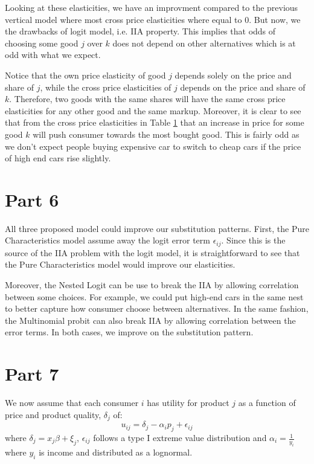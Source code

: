 \documentclass[12pt]{article}
\newcommand{\1}{{\bf 1}} %
\begin{document}
\begin{table}[H]
{\begin{tabular}{lllllllllll}
 \hline
\bottomrule
\end{tabular}%
}
 \label{tab:logit_elasticities}
\end{table}

Looking at these elasticities, we have an improvment compared to the previous vertical model where most cross price elasticities where equal to 0. But now, we the drawbacks of logit model, i.e. IIA property. This implies that odds of choosing some good $j$ over $k$ does not depend on other alternatives which is at odd with what we expect.

Notice that the own price elasticity of good $j$ depends solely on the price and share of $j$, while the cross price elasticities of $j$ depends on the price and share of $k$. Therefore, two goods with the same shares will have the same cross price elasticities for any other good and the same markup. Moreover, it is clear to see that from the cross price elasticities in Table \ref{tab:logit_elasticities} that an increase in price for some good $k$ will push consumer towards the most bought good. This is fairly odd as we don't expect people buying expensive car to switch to cheap cars if the price of high end cars rise slightly.



\section*{Part 6}

All three proposed model could improve our substitution patterns. First, the Pure Characteristics model assume away the logit error term $\epsilon_{ij}$. Since this is the source of the IIA problem with the logit model, it is straightforward to see that the Pure Characteristics model would improve our elasticities.

Moreover, the Nested Logit can be use to break the IIA by allowing correlation between some choices. For example, we could put high-end cars in the same nest to better capture how consumer choose between alternatives. In the same fashion, the Multinomial probit can also break IIA by allowing correlation between the error terms. In both cases, we improve on the substitution pattern.


\section*{Part 7}


We now assume that each consumer $i$ has utility for product $j$ as a function of price and product quality, $\delta_j$ of:
\[
u_{ij} =\delta_j-\alpha_i p_j+\epsilon_{ij}
\]
where $\delta_j = x_j\beta +\xi_j $, $\epsilon_{ij}$ follows a type I extreme value distribution and $\alpha_i = \frac{1}{y_i}$ where $y_i$ is income and distributed as a lognormal.
\end{document}
